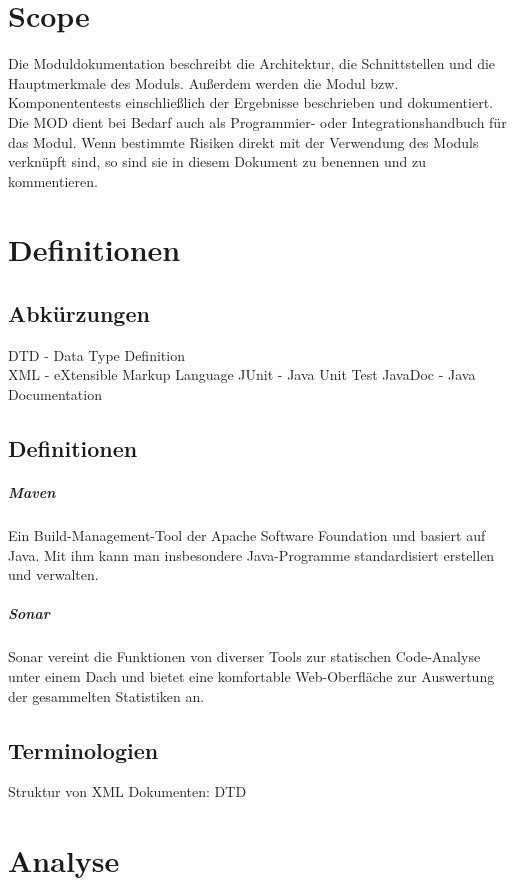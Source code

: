 
\chapter{Scope}
Die Moduldokumentation beschreibt die Architektur, die Schnittstellen
und die Hauptmerkmale des Moduls. Außerdem werden die Modul bzw. Komponententests
einschließlich der Ergebnisse beschrieben und dokumentiert.
Die MOD dient bei Bedarf auch als Programmier- oder Integrationshandbuch für das
Modul. Wenn bestimmte Risiken direkt mit der Verwendung des Moduls verknüpft sind,
so sind sie in diesem Dokument zu benennen und zu kommentieren.

\chapter{Definitionen}

\section{Abkürzungen}
DTD - Data Type Definition\\
XML - eXtensible Markup Language
JUnit - Java Unit Test
JavaDoc - Java Documentation

\section{Definitionen}
\paragraph{Maven} Ein Build-Management-Tool der Apache Software Foundation und basiert auf Java. Mit ihm kann man insbesondere Java-Programme standardisiert erstellen und verwalten.
\paragraph{Sonar} Sonar vereint die Funktionen von diverser Tools zur statischen Code-Analyse unter einem Dach und bietet eine komfortable Web-Oberfläche zur Auswertung der gesammelten Statistiken an.%

\section{Terminologien}
Struktur von XML Dokumenten: DTD

\chapter{Analyse}

